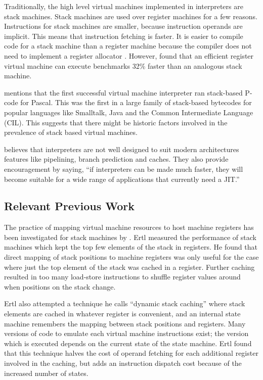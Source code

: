 		Traditionally, the high level virtual machines implemented in interpreters are stack machines. Stack machines are used over register machines for a few reasons. Instructions for stack machines are smaller, because instruction operands are implicit. This means that instruction fetching is faster. It is easier to compile code for a stack machine than a register machine because the compiler does not need to implement a register allocator \citep{caseregistervm}. However, \cite{stackregistershowdown} found that an efficient register virtual machine can execute benchmarks 32\% faster than an analogous stack machine. 
		
		\cite{caseregistervm} mentions that the first successful virtual machine interpreter ran stack-based P-code for Pascal. This was the first in a large family of stack-based bytecodes for popular languages like Smalltalk, Java and the Common Intermediate Language (CIL). This suggests that there might be historic factors involved in the prevalence of stack based virtual machines.
		
		\cite{fastjava} believes that interpreters are not well designed to suit modern architectures features like pipelining, branch prediction and caches. They also provide encouragement by saying, ``if interpreters can be made much faster, they will become suitable for a wide range of applications that currently need a JIT.''
		
		
		\subsection{Relevant Previous Work}
		
		The practice of mapping virtual machine resources to host machine registers has been investigated for stack machines by \cite{stackcaching}. Ertl measured the performance of stack machines which kept the top few elements of the stack in registers. He found that direct mapping of stack positions to machine registers was only useful for the case where just the top element of the stack was cached in a register. Further caching resulted in too many load-store instructions to shuffle register values around when positions on the stack change.
		
		Ertl also attempted a technique he calls ``dynamic stack caching'' where stack elements are cached in whatever register is convenient, and an internal state machine remembers the mapping between stack positions and registers. Many versions of code to emulate each virtual machine instructions exist; the version which is executed depends on the current state of the state machine. Ertl found that this technique halves the cost of operand fetching for each additional register involved in the caching, but adds an instruction dispatch cost because of the increased number of states.
		
